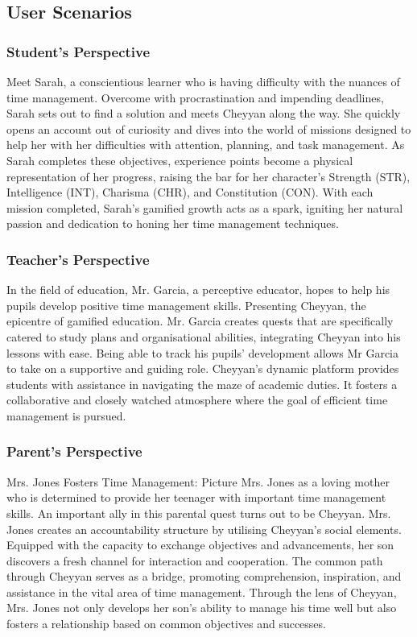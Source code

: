 \documentclass{l4proj}
\begin{document}
\subsection{User Scenarios}
\subsubsection{Student's Perspective}
Meet Sarah, a conscientious learner who is having difficulty with the nuances of time management. Overcome with procrastination and impending deadlines, Sarah sets out to find a solution and meets Cheyyan along the way. She quickly opens an account out of curiosity and dives into the world of missions designed to help her with her difficulties with attention, planning, and task management. As Sarah completes these objectives, experience points become a physical representation of her progress, raising the bar for her character's Strength (STR), Intelligence (INT), Charisma (CHR), and Constitution (CON). With each mission completed, Sarah's gamified growth acts as a spark, igniting her natural passion and dedication to honing her time management techniques.
\\
\subsubsection{Teacher's Perspective}
In the field of education, Mr. Garcia, a perceptive educator, hopes to help his pupils develop positive time management skills. Presenting Cheyyan, the epicentre of gamified education. Mr. Garcia creates quests that are specifically catered to study plans and organisational abilities, integrating Cheyyan into his lessons with ease. Being able to track his pupils' development allows Mr Garcia to take on a supportive and guiding role. Cheyyan's dynamic platform provides students with assistance in navigating the maze of academic duties. It fosters a collaborative and closely watched atmosphere where the goal of efficient time management is pursued.
\\
\subsubsection{Parent's Perspective}
Mrs. Jones Fosters Time Management: Picture Mrs. Jones as a loving mother who is determined to provide her teenager with important time management skills. An important ally in this parental quest turns out to be Cheyyan. Mrs. Jones creates an accountability structure by utilising Cheyyan's social elements. Equipped with the capacity to exchange objectives and advancements, her son discovers a fresh channel for interaction and cooperation. The common path through Cheyyan serves as a bridge, promoting comprehension, inspiration, and assistance in the vital area of time management. Through the lens of Cheyyan, Mrs. Jones not only develops her son's ability to manage his time well but also fosters a relationship based on common objectives and successes.
\end{document}
